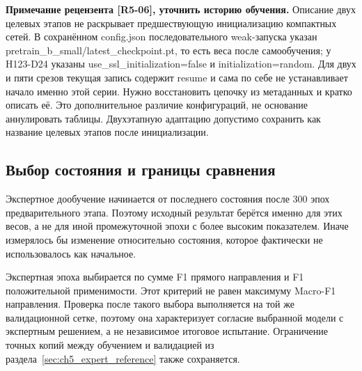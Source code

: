 \ifdefined\AuthorReview
\par\smallskip\begingroup\small\raggedright\color{red!60!black}
\noindent\textbf{Примечание рецензента [R5-06], уточнить историю обучения.} Описание двух целевых этапов не раскрывает предшествующую инициализацию компактных сетей. В сохранённом config.json последовательного weak-запуска указан pretrain\_b\_small/latest\_checkpoint.pt, то есть веса после самообучения; у H123-D24 указаны use\_ssl\_initialization=false и initialization=random. Для двух и пяти срезов текущая запись содержит resume и сама по себе не устанавливает начало именно этой серии. Нужно восстановить цепочку из метаданных и кратко описать её. Это дополнительное различие конфигураций, не основание аннулировать таблицы. Двухэтапную адаптацию допустимо сохранить как название целевых этапов после инициализации.\par\endgroup\smallskip
\fi
\ifdefined\AuthorReview
\par{}\smallskip
\fi

{}

\subsection{Выбор состояния и границы сравнения}

Экспертное дообучение начинается от последнего состояния
после 300 эпох предварительного этапа.
Поэтому исходный результат берётся именно для этих весов,
а не для иной промежуточной эпохи с более высоким показателем.
Иначе измерялось бы изменение относительно состояния,
которое фактически не использовалось как начальное.

Экспертная эпоха выбирается по сумме F1 прямого направления
и F1 положительной применимости.
Этот критерий не равен максимуму Macro-F1 направления.
Проверка после такого выбора выполняется на той же
валидационной сетке, поэтому она характеризует
согласие выбранной модели с экспертным решением,
а не независимое итоговое испытание.
Ограничение точных копий между обучением и валидацией
из раздела~\ref{sec:ch5_expert_reference} также сохраняется.

